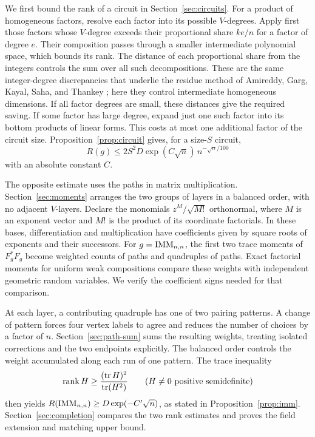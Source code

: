 We first bound the rank of a circuit in Section~\ref{sec:circuits}.
For a product of homogeneous factors, resolve each factor into its possible
$V$-degrees.  Apply first those factors whose $V$-degree exceeds their
proportional share $ke/n$ for a factor of degree $e$.  Their composition passes through
a smaller intermediate polynomial space, which bounds its rank.  The
distance of each proportional share from the integers controls the sum over
all such decompositions.  These are the same integer-degree discrepancies
that underlie the residue method of Amireddy, Garg, Kayal, Saha, and
Thankey \cite[Definition~2.1 and Lemma~3.1]{AmireddyGargKayalSahaThankey2022Full};
here they control intermediate homogeneous dimensions.
If all factor degrees are small, these distances
give the required saving.  If some factor has large degree, expand just one
such factor into its bottom products of linear forms.  This costs at most
one additional factor of the circuit size.  Proposition~\ref{prop:circuit}
gives, for a size-$S$ circuit,
\[
 R(g)\leq 2S^2D\exp(C\sqrt n)\,n^{-\sqrt n/100}
\]
with an absolute constant $C$.

The opposite estimate uses the paths in matrix multiplication.
Section~\ref{sec:moments} arranges the two groups of layers in a balanced
order, with no adjacent $V$-layers.  Declare the monomials
$z^M/\sqrt{M!}$ orthonormal, where $M$ is an exponent vector and
$M!$ is the product of its coordinate factorials.  In these bases,
differentiation and multiplication have coefficients given by square roots
of exponents and their successors.  For $g=\operatorname{IMM}_{n,n}$,
the first two trace moments of $F_g^*F_g$ become weighted counts of paths
and quadruples of paths.  Exact factorial moments for uniform weak
compositions compare these weights with independent geometric random
variables.  We verify the coefficient signs needed for that comparison.

At each layer, a contributing quadruple has one of two pairing patterns.
A change of pattern forces four vertex labels to agree and reduces the
number of choices by a factor of $n$.  Section~\ref{sec:path-sum} sums the
resulting weights, treating isolated corrections and the two endpoints
explicitly.  The balanced order controls the weight accumulated along each
run of one pattern.  The trace inequality
\[
 \operatorname{rank} H\geq\frac{(\operatorname{tr} H)^2}{\operatorname{tr}(H^2)}
 \qquad(H\ne0\text{ positive semidefinite})
\]
then yields $R(\operatorname{IMM}_{n,n})\geq D\exp(-C'\sqrt n)$, as stated in
Proposition~\ref{prop:imm}.  Section~\ref{sec:completion} compares the two
rank estimates and proves the field extension and matching upper bound.
